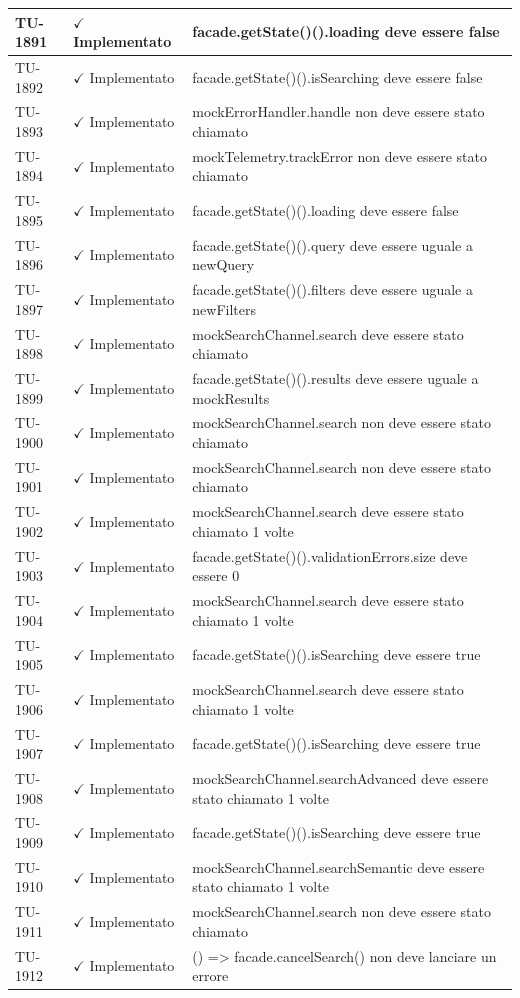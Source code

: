 ﻿\documentclass[a4paper,12pt]{article}
\newcommand{\ok}{\textcolor{green!60!black}{$\checkmark$ Implementato}}
\begin{document}
\begin{longtable}{|p{2cm}|p{3.5cm}|p{9.5cm}|}
\hline
TU-1891 & \ok & facade.getState()().loading deve essere false \\
\hline
TU-1892 & \ok & facade.getState()().isSearching deve essere false \\
\hline
TU-1893 & \ok & mockErrorHandler.handle non deve essere stato chiamato \\
\hline
TU-1894 & \ok & mockTelemetry.trackError non deve essere stato chiamato \\
\hline
TU-1895 & \ok & facade.getState()().loading deve essere false \\
\hline
TU-1896 & \ok & facade.getState()().query deve essere uguale a newQuery \\
\hline
TU-1897 & \ok & facade.getState()().filters deve essere uguale a newFilters \\
\hline
TU-1898 & \ok & mockSearchChannel.search deve essere stato chiamato \\
\hline
TU-1899 & \ok & facade.getState()().results deve essere uguale a mockResults \\
\hline
TU-1900 & \ok & mockSearchChannel.search non deve essere stato chiamato \\
\hline
TU-1901 & \ok & mockSearchChannel.search non deve essere stato chiamato \\
\hline
TU-1902 & \ok & mockSearchChannel.search deve essere stato chiamato 1 volte \\
\hline
TU-1903 & \ok & facade.getState()().validationErrors.size deve essere 0 \\
\hline
TU-1904 & \ok & mockSearchChannel.search deve essere stato chiamato 1 volte \\
\hline
TU-1905 & \ok & facade.getState()().isSearching deve essere true \\
\hline
TU-1906 & \ok & mockSearchChannel.search deve essere stato chiamato 1 volte \\
\hline
TU-1907 & \ok & facade.getState()().isSearching deve essere true \\
\hline
TU-1908 & \ok & mockSearchChannel.searchAdvanced deve essere stato chiamato 1 volte \\
\hline
TU-1909 & \ok & facade.getState()().isSearching deve essere true \\
\hline
TU-1910 & \ok & mockSearchChannel.searchSemantic deve essere stato chiamato 1 volte \\
\hline
TU-1911 & \ok & mockSearchChannel.search non deve essere stato chiamato \\
\hline
TU-1912 & \ok & () => facade.cancelSearch() non deve lanciare un errore \\

\end{longtable}
\end{document}
